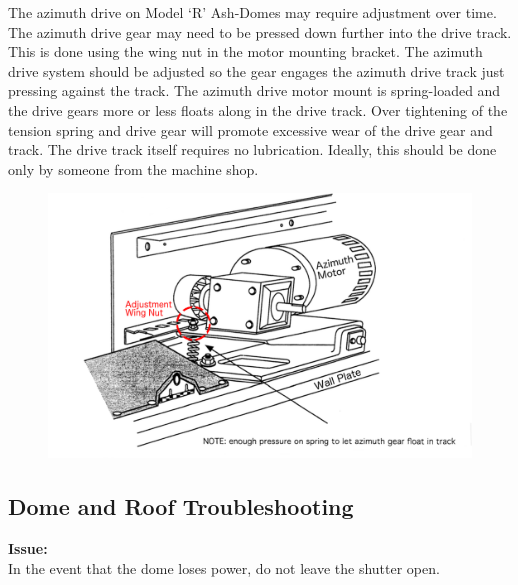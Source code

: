 \documentclass[12pt,titlepage]{article}
\begin{document}
The azimuth drive on Model ‘R’ Ash-Domes may require adjustment over time.
The azimuth drive gear may need to be pressed down further into the drive track.
This is done using the wing nut in the motor mounting bracket.
The azimuth drive system should be adjusted so the gear engages the azimuth drive track just pressing against the track.
The azimuth drive motor mount is spring-loaded and the drive gears more or less floats along in the drive track.
Over tightening of the tension spring and drive gear will promote excessive wear of the drive gear and track.
The drive track itself requires no lubrication.
Ideally, this should be done only by someone from the machine shop.
\begin{figure}[H] 
	\begin{center}
		\includegraphics[width=.8\textwidth]{./images/dome/azimuth_motor_wide.png} 
		\label{azimuth_motor}
	\end{center}
\end{figure}

\subsection{Dome and Roof Troubleshooting}\label{ssec:dome_trouble}
\noindent\textbf{Issue:}\\
In the event that the dome loses power, do not leave the shutter open.\\
\end{document}
